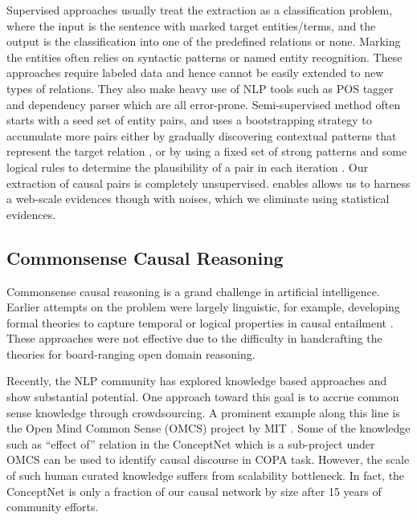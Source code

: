 Supervised approaches usually treat the extraction as a
classification problem, where the input is the sentence with marked
target entities/terms, and the output is the classification into one
of the predefined relations or none. Marking the entities often
relies on syntactic patterns or named entity recognition. These
approaches require labeled data and hence cannot be easily extended
to new types of relations. They also make heavy use of NLP tools
such as POS tagger and dependency parser which are all error-prone.
Semi-supervised method often starts with a seed set of entity pairs,
and uses a bootstrapping strategy to accumulate more pairs either by
gradually discovering contextual patterns that represent the target
relation \cite{Etzioni:Web}, or by using a fixed set of strong
patterns and some logical rules to determine the plausibility of a
pair in each iteration \cite{12MSRA:Probase}. Our extraction of
causal pairs is completely unsupervised. enables allows us to
harness a web-scale evidences though with noises, which we eliminate
using statistical evidences.

\subsection{Commonsense Causal Reasoning}

Commonsense causal reasoning is a grand challenge in artificial
intelligence. Earlier attempts on the problem were largely
linguistic, for example, developing formal theories to capture
temporal or logical properties in causal entailment
\cite{LascaridesAO92,lascarides:asher:1993a}. These approaches were
not effective due to the difficulty in handcrafting the theories for
board-ranging open domain reasoning.

Recently, the NLP community has explored knowledge based approaches
and show substantial potential. One approach toward this goal is to
accrue common sense knowledge through crowdsourcing. A prominent
example along this line is the Open Mind Common Sense (OMCS) project
by MIT \cite{singh2002open}. Some of the knowledge such as ``effect
of'' relation in the ConceptNet \cite{liu2004commonsense} which is a
sub-project under OMCS can be used to identify causal discourse in
COPA task. However, the scale of such human curated knowledge
suffers from scalability bottleneck. In fact, the ConceptNet is only
a fraction of our causal network by size after 15 years of community
efforts.

